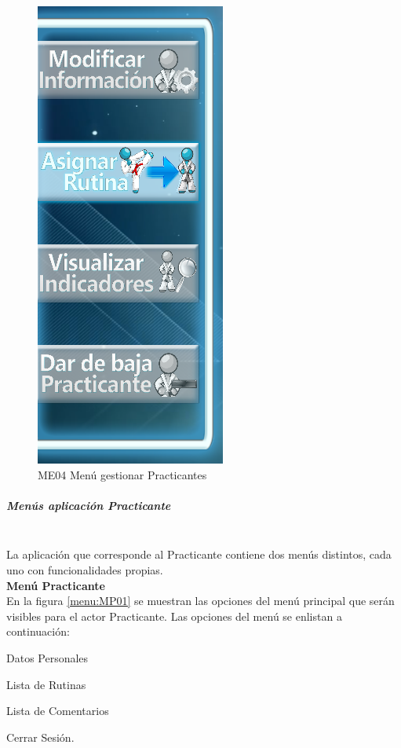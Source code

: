 \begin{figure}[H]
	\centering
		\includegraphics[scale=0.5]{./Figuras/Menus/ME04Gestionar_Practicantes}
	\caption{ME04 Menú gestionar Practicantes}
	\label{menu:ME04}
\end{figure}

\subparagraph{Menús aplicación Practicante} \hspace{1cm}\\ 
La aplicación que corresponde al Practicante contiene dos menús distintos, cada uno con funcionalidades propias. \\

\textbf{\textcolor[rgb]{0, 0, 0.545098}{Menú Practicante}} \\

En la figura \ref{menu:MP01} se muestran las opciones del menú principal que serán visibles para el actor Practicante. Las opciones del menú se enlistan a continuación:\\

\begin{compactitem} 
	\setlength\itemsep{-0.25em}
	\item Datos Personales
	\item Lista de Rutinas
	\item Lista de Comentarios
	\item Cerrar Sesión.
\end{compactitem}

